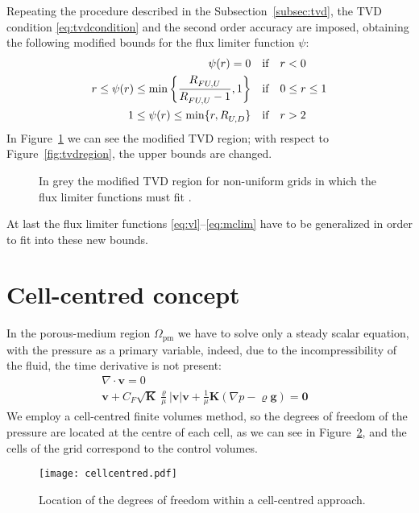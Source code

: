 Repeating the procedure described in the Subsection~\ref{subsec:tvd}, the TVD 
condition \eqref{eq:tvdcondition} and the second order accuracy are imposed, 
obtaining the following modified bounds for the flux limiter function $\psi$:
\begin{align}
\notag \psi(r) = 0 \quad &\text{if} \quad r < 0\\
r \leq \psi(r) \leq \min \bigg \{\frac{\RFUU}{\RFUU - 1}, 1 \bigg \} \quad 
&\text{if} \quad 0 \leq r \leq 1\\
\notag 1 \leq \psi(r) \leq \min \{r,\RUD \} \quad &\text{if} \quad r > 2
\end{align}
In Figure~\ref{fig:tvdregionhou} we can see the modified TVD region; with 
respect to Figure~\ref{fig:tvdregion}, the upper bounds are changed.
\begin{figure}[t]
	\centering
	
	\caption[Modified TVD region]{In grey the modified TVD region for 
	non-uniform grids in which the flux limiter functions must fit 
	\cite{nonunif:hou}.}
	\label{fig:tvdregionhou}
\end{figure} 
At last the flux limiter functions \eqref{eq:vl}--\eqref{eq:mclim} have to be 
generalized in order to fit into these new bounds.

\section{Cell-centred concept}
In the porous-medium region $\Omega_\text{pm}$ we have to solve only a steady 
scalar equation, with the 
pressure as a primary variable, indeed, due to the incompressibility of the 
fluid, the time derivative is not present:
\begin{align}
\label{eq:cellcentred}	\nabla \cdot \mathbf{v} = 0&\\
\label{eq:forch2}	\mathbf{v} + C_F \sqrt{\mathbf{K}} \frac{\varrho}{\mu} 
	|\mathbf{v}|\mathbf{v} + \frac{1}{\mu} \mathbf{K}(\nabla p - \varrho 
	\mathbf{g} ) = \mathbf{0}&
\end{align}
We employ a cell-centred finite volumes method, so the degrees of freedom of 
the pressure are located at the centre of each cell, as we can see in 
Figure~\ref{fig:cellcentred}, and the cells of the grid correspond to the 
control volumes.
\begin{figure}
	\centering
	\texttt{[image: cellcentred.pdf]}
	\caption[Cell-centred grid]{Location of the degrees of freedom within a 
	cell-centred approach.}
	\label{fig:cellcentred}
\end{figure}


